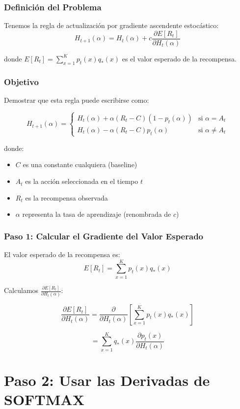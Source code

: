 \documentclass[12pt,a4paper]{article}
\begin{document}
\subsubsection{Definición del Problema}
Tenemos la regla de actualización por gradiente ascendente estocástico:
$$H_{t+1}(\alpha) = H_t(\alpha) + c \frac{\partial E[R_t]}{\partial H_t(\alpha)}$$

donde $E[R_t] = \sum_{x=1}^{K} p_t(x)q_*(x)$ es el valor esperado de la recompensa.

\subsubsection{Objetivo}
Demostrar que esta regla puede escribirse como:

$$H_{t+1}(\alpha) = \begin{cases}
H_t(\alpha) + \alpha(R_t - C)(1 - p_t(\alpha)) & \text{si } \alpha = A_t \\
H_t(\alpha) - \alpha(R_t - C)p_t(\alpha) & \text{si } \alpha \neq A_t
\end{cases}$$

donde:
\begin{itemize}
    \item $C$ es una constante cualquiera (baseline)
    \item $A_t$ es la acción seleccionada en el tiempo $t$
    \item $R_t$ es la recompensa observada
    \item $\alpha$ representa la tasa de aprendizaje (renombrada de $c$)
\end{itemize}

\subsubsection{Paso 1: Calcular el Gradiente del Valor Esperado}

El valor esperado de la recompensa es:
$$E[R_t] = \sum_{x=1}^{K} p_t(x)q_*(x)$$

Calculamos $\frac{\partial E[R_t]}{\partial H_t(\alpha)}$:

$$\frac{\partial E[R_t]}{\partial H_t(\alpha)} = \frac{\partial}{\partial H_t(\alpha)}\left[\sum_{x=1}^{K} p_t(x)q_*(x)\right]$$

$$= \sum_{x=1}^{K} q_*(x) \frac{\partial p_t(x)}{\partial H_t(\alpha)}$$

\section{Paso 2: Usar las Derivadas de SOFTMAX}
\end{document}
